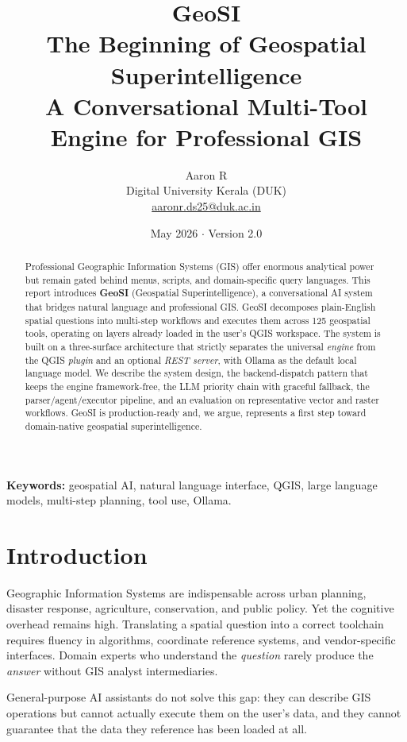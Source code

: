 \documentclass[11pt,a4paper]{article}
\title{%
  \vspace{-1cm}%
  {\color{geosinavy}\Huge\bfseries GeoSI}\\[0.4em]
  {\color{geositeal}\Large The Beginning of Geospatial Superintelligence}\\[0.3em]
  {\color{geosimuted}\normalsize A Conversational Multi-Tool Engine for Professional GIS}
}
\author{Aaron R \\ \small Digital University Kerala (DUK) \\ \small \href{mailto:aaronr.ds25@duk.ac.in}{aaronr.ds25@duk.ac.in}}
\date{May 2026 \quad $\cdot$ \quad Version 2.0}
\begin{document}
\maketitle
\thispagestyle{empty}

\begin{abstract}
\noindent
Professional Geographic Information Systems (GIS) offer enormous analytical
power but remain gated behind menus, scripts, and domain-specific query
languages. This report introduces \textbf{GeoSI} (Geospatial
Superintelligence), a conversational AI system that bridges natural
language and professional GIS. GeoSI decomposes plain-English spatial
questions into multi-step workflows and executes them across 125
geospatial tools, operating on layers already loaded in the user's QGIS
workspace. The system is built on a three-surface architecture that
strictly separates the universal \emph{engine} from the QGIS
\emph{plugin} and an optional \emph{REST server}, with Ollama as the
default local language model. We describe the system design, the
backend-dispatch pattern that keeps the engine framework-free, the
LLM priority chain with graceful fallback, the parser/agent/executor
pipeline, and an evaluation on representative vector and raster
workflows. GeoSI is production-ready and, we argue, represents a first
step toward domain-native geospatial superintelligence.
\end{abstract}

\vspace{0.5em}
\noindent\textbf{Keywords:} geospatial AI, natural language interface,
QGIS, large language models, multi-step planning, tool use, Ollama.

\tableofcontents
\newpage

\section{Introduction}
Geographic Information Systems are indispensable across urban planning,
disaster response, agriculture, conservation, and public policy. Yet
the cognitive overhead remains high. Translating a spatial question
into a correct toolchain requires fluency in algorithms, coordinate
reference systems, and vendor-specific interfaces. Domain experts who
understand the \emph{question} rarely produce the \emph{answer} without
GIS analyst intermediaries.

General-purpose AI assistants do not solve this gap: they can describe
GIS operations but cannot actually execute them on the user's data,
and they cannot guarantee that the data they reference has been loaded
at all.
\end{document}

